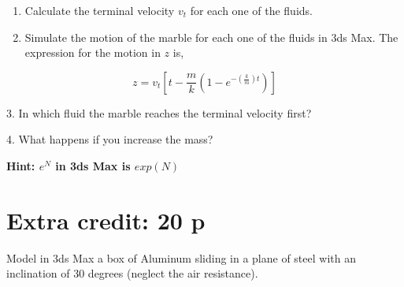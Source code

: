 \documentclass[12pt]{article}
\begin{document}
  \begin{enumerate}
    \item Calculate the terminal velocity $v_t$ for each one of the fluids.
    \item Simulate the motion of the marble for each one of the fluids in 3ds Max. The expression for the motion in $z$ is,
  \end{enumerate}

\begin{equation}
  z=v_t\left[ t-\frac{m}{k}(1-e^{-(\frac{k}{m})t})  \right]
\end{equation}


3. In which fluid the marble reaches the terminal velocity first?

\vspace{4mm}

4.  What happens if you increase the mass?

\vspace{8mm}

\textbf{Hint: $e^{N}$ in 3ds Max is $exp(N)$ }




\section*{Extra credit: 20 p}

Model in 3ds Max a box of Aluminum sliding in a plane of steel with an inclination of $30$ degrees (neglect the air resistance).
\end{document}

